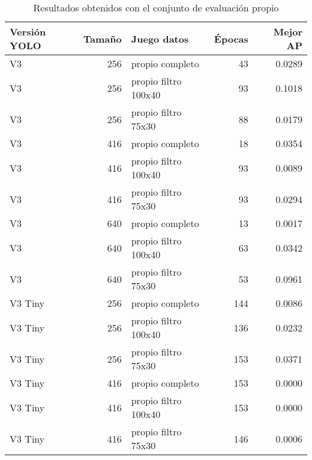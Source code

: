 \begin{table}[H]
	\centering
	\begin{tabular}{lrlrr}
		\toprule
		Versión YOLO &  Tamaño &    Juego datos &  Épocas &  Mejor AP \\
		\midrule
		V3      &     256 &       propio completo &      43 &    0.0289 \\
		V3      &     256 &  propio filtro 100x40 &      93 &    0.1018 \\
		V3      &     256 &   propio filtro 75x30 &      88 &    0.0179 \\
		V3      &     416 &       propio completo &      18 &    0.0354 \\
		V3      &     416 &  propio filtro 100x40 &      93 &    0.0089 \\
		V3      &     416 &   propio filtro 75x30 &      93 &    0.0294 \\
		V3      &     640 &       propio completo &      13 &    0.0017 \\
		V3      &     640 &  propio filtro 100x40 &      63 &    0.0342 \\
		V3      &     640 &   propio filtro 75x30 &      53 &    0.0961 \\
		V3 Tiny &     256 &       propio completo &     144 &    0.0086 \\
		V3 Tiny &     256 &  propio filtro 100x40 &     136 &    0.0232 \\
		V3 Tiny &     256 &   propio filtro 75x30 &     153 &    0.0371 \\
		V3 Tiny &     416 &       propio completo &     153 &    0.0000 \\
		V3 Tiny &     416 &  propio filtro 100x40 &     153 &    0.0000 \\
		V3 Tiny &     416 &   propio filtro 75x30 &     146 &    0.0006 \\
		\bottomrule
	\end{tabular}
	\caption{Resultados obtenidos con el conjunto de evaluación propio}
	\label{tab:evaluationcustom}
\end{table}